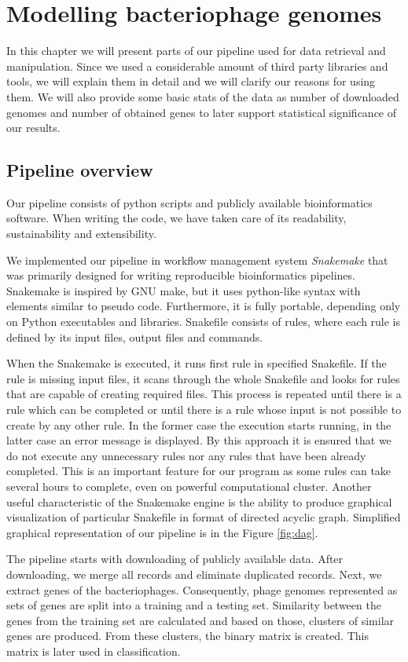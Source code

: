 \chapter{Modelling bacteriophage genomes}
In this chapter we will present parts of our pipeline used for data retrieval and manipulation.
Since we used a considerable amount of third party libraries and tools, we will explain them in detail and we will clarify our reasons for using them.
We will also provide some basic stats of the data as number of downloaded genomes and number of obtained genes to later support statistical significance of our results.

\section{Pipeline overview}
Our pipeline consists of python scripts and publicly available bioinformatics software.
When writing the code, we have taken care of its readability, sustainability and extensibility.

We implemented our pipeline in  workflow management system \emph{Snakemake} \cite{snakemake} that was primarily designed for writing reproducible bioinformatics pipelines.
Snakemake is inspired by GNU make, but it uses python-like syntax with elements similar to pseudo code.
Furthermore, it is fully portable, depending only on Python executables and libraries.
Snakefile consists of rules, where each rule is defined by its input files, output files and commands.

When the Snakemake is executed, it runs first rule in specified Snakefile.
If the rule is missing input files, it scans through the whole Snakefile and looks for rules that are capable of creating required files.
This process is repeated until there is a rule which can be completed or until there is a rule whose input is not possible to create by any other rule.
In the former case the execution starts running, in the latter case an error message is displayed.
By this approach it is ensured that we do not execute any unnecessary rules nor any rules that have been already completed.
This is an important feature for our program as some rules can take several hours to complete, even on powerful computational cluster.
Another useful characteristic of the Snakemake engine is the ability to produce graphical visualization of particular Snakefile in format of directed acyclic graph.
Simplified graphical representation of our pipeline is in the Figure \ref{fig:dag}.

The pipeline starts with downloading of publicly available data.
After downloading, we merge all records and eliminate duplicated records.
Next, we extract genes of the bacteriophages.
Consequently, phage genomes represented as sets of genes are split into a training and a testing set.
Similarity between the genes from the training set are calculated and based on those, clusters of similar genes are produced.
From these clusters, the binary matrix is created.
This matrix is later used in classification.

